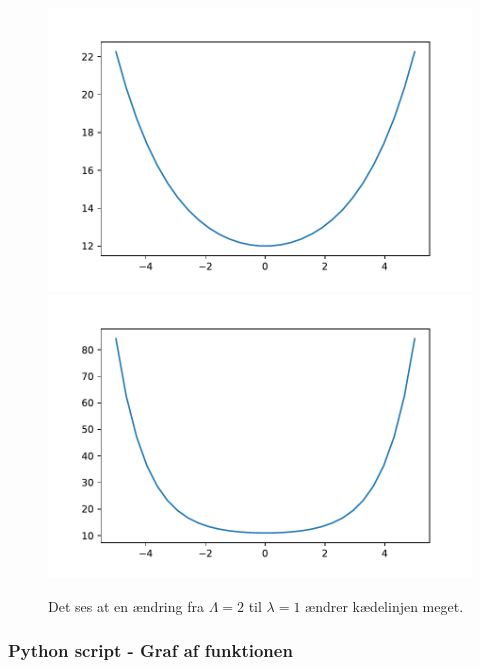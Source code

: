 \begin{figure}[h!]
\includegraphics[scale=0.5]{code/fig3}
\includegraphics[scale=0.5]{code/fig4}
\caption{Det ses at en ændring fra $\Lambda=2$ til $\lambda=1$ ændrer kædelinjen meget.}
\end{figure}
%
\subsubsection*{Python script - Graf af funktionen}
%

%